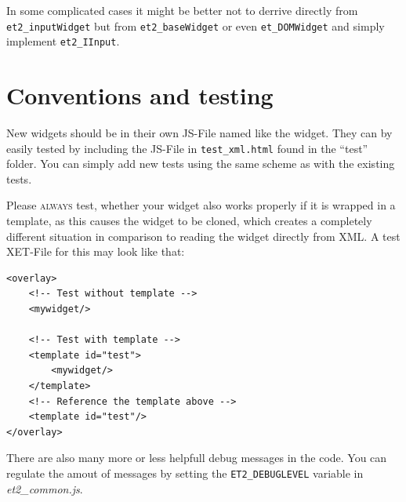 \documentclass[10pt,a4paper]{report}
\begin{document}
In some complicated cases it might be better not to derrive directly from \texttt{et2\_inputWidget} but from \texttt{et2\_baseWidget} or even \texttt{et\_DOMWidget} and simply implement \texttt{et2\_IInput}.

\section*{Conventions and testing}

New widgets should be in their own JS-File named like the widget. They can by easily tested by including the JS-File in \texttt{test\_xml.html} found in the ``test'' folder. You can simply add new tests using the same scheme as with the existing tests.

Please \textsc{always} test, whether your widget also works properly if it is wrapped in a template, as this causes the widget to be cloned, which creates a completely different situation in comparison to reading the widget directly from XML. A test XET-File for this may look like that:
\begin{verbatim}
<overlay>
    <!-- Test without template -->
    <mywidget/>
    
    <!-- Test with template -->
    <template id="test">
        <mywidget/>
    </template>
    <!-- Reference the template above -->
    <template id="test"/>
</overlay>
\end{verbatim}

There are also many more or less helpfull debug messages in the code. You can regulate the amout of messages by setting the \texttt{ET2\_DEBUGLEVEL} variable in \textit{et2\_common.js}.
\end{document}
